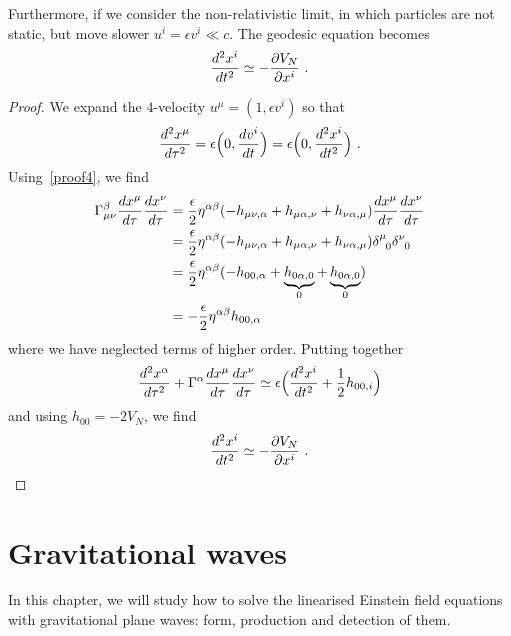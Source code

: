     Furthermore, if we consider the non-relativistic limit, in which particles are not static, but move slower $u^i = \epsilon v^i \ll c$. The geodesic equation becomes 
    \begin{equation*}
        \frac{d^2x^i}{dt^2} \simeq - \frac{\partial V_N}{\partial x^i} ~.
    \end{equation*}
    \begin{proof}
        We expand the $4$-velocity $u^\mu = (1, \epsilon v^i)$ so that 
        \begin{equation*}
            \frac{d^2x^\mu}{d\tau^2} = \epsilon \Big (0, \frac{dv^i}{dt} \Big) = \epsilon \Big (0, \frac{d^2x^i}{dt^2} \Big) ~.
        \end{equation*}
        Using~\eqref{proof4}, we find 
        \begin{equation*}
        \begin{aligned}
            \Gamma^\beta_{\mu\nu} \dv{x^\mu}{\tau} \dv{x^\nu}{\tau} & = \frac{\epsilon}{2} \eta^{\alpha\beta} (- h_{\mu\nu,\alpha} + h_{\mu\alpha,\nu} + h_{\nu\alpha,\mu} ) \dv{x^\mu}{\tau} \dv{x^\nu}{\tau} \\ & = \frac{\epsilon}{2} \eta^{\alpha\beta} (- h_{\mu\nu,\alpha} + h_{\mu\alpha,\nu} + h_{\nu\alpha,\mu} ) \delta^{\mu}_{\phantom \mu 0} \delta^{\nu}_{\phantom \nu 0} \\ & = \frac{\epsilon}{2} \eta^{\alpha\beta} (- h_{00,\alpha} + \underbrace{h_{0\alpha,0}}_0 + \underbrace{h_{0\alpha,0}}_0 ) \\ & = - \frac{\epsilon}{2} \eta^{\alpha\beta} h_{00, \alpha}
        \end{aligned}
        \end{equation*}
        where we have neglected terms of higher order. Putting together 
        \begin{equation*}
            \frac{d^2x^\alpha}{d\tau^2} + \Gamma^\alpha \frac{dx^\mu}{d\tau} \frac{dx^\nu}{d\tau} \simeq \epsilon \Big ( \frac{d^2x^i}{dt^2} + \frac{1}{2} h_{00,i} \Big)
        \end{equation*}
        and using $h_{00} = - 2 V_N$, we find 
        \begin{equation*}
            \frac{d^2x^i}{dt^2} \simeq - \frac{\partial V_N}{\partial x^i} ~.
        \end{equation*}
    \end{proof}

\chapter{Gravitational waves}

    In this chapter, we will study how to solve the linearised Einstein field equations with gravitational plane waves: form, production and detection of them.

